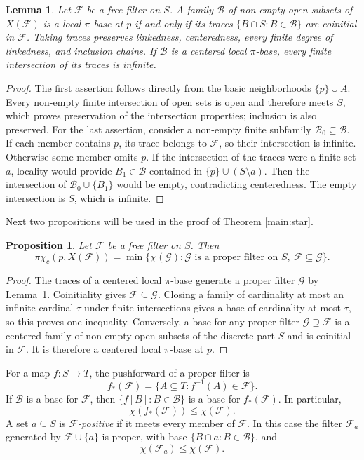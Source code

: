\documentclass[11pt,a4paper]{amsart}
\newtheorem{proposition}[theorem]{Proposition}
\newtheorem{lemma}[theorem]{Lemma}
\theoremstyle{definition}
\theoremstyle{remark}
\newcommand{\F}{\mathcal F}
\newcommand{\G}{\mathcal G}
\newcommand{\B}{\mathcal B}
\newcommand{\pcc}{\pi\chi_c}
\begin{document}
\begin{lemma}\label{lem:traces}
Let $\F$ be a free filter on $S$. A family $\B$ of non-empty open subsets of $X(\F)$ is a local $\pi$-base at $p$ if and only if its traces $\{B\cap S:B\in\B\}$ are coinitial in $\F$. Taking traces preserves linkedness, centeredness, every finite degree of linkedness, and inclusion chains. If $\B$ is a centered local $\pi$-base, every finite intersection of its traces is infinite.
\end{lemma}
\begin{proof}
The first assertion follows directly from the basic neighborhoods $\{p\}\cup A$. Every non-empty finite intersection of open sets is open and therefore meets $S$, which proves preservation of the intersection properties; inclusion is also preserved. For the last assertion, consider a non-empty finite subfamily $\B_0\subseteq\B$. If each member contains $p$, its trace belongs to $\F$, so their intersection is infinite. Otherwise some member omits $p$. If the intersection of the traces were a finite set $a$, locality would provide $B_1\in\B$ contained in $\{p\}\cup(S\setminus a)$. Then the intersection of $\B_0\cup\{B_1\}$ would be empty, contradicting centeredness. The empty intersection is $S$, which is infinite.
\end{proof}
Next two propositions will be used in the proof of Theorem \ref{main:star}.
\begin{proposition}\label{prop:extensions}
Let $\F$ be a free filter on $S$. Then
\begin{equation}\label{eq:extensions}
\pcc(p,X(\F))=
\min\{\chi(\G):\G\text{ is a proper filter on }S,\ \F\subseteq\G\}.
\end{equation}
\end{proposition}
\begin{proof}
The traces of a centered local $\pi$-base generate a proper filter $\G$ by Lemma~\ref{lem:traces}. Coinitiality gives $\F\subseteq\G$. Closing a family of cardinality at most an infinite cardinal $\tau$ under finite intersections gives a base of cardinality at most $\tau$, so this proves one inequality. Conversely, a base for any proper filter $\G\supseteq\F$ is a centered family of non-empty open subsets of the discrete part $S$ and is coinitial in $\F$. It is therefore a centered local $\pi$-base at $p$.
\end{proof}

For a map $f:S\to T$, the pushforward of a proper filter is
\[
f_*(\F)=\{A\subseteq T:f^{-1}(A)\in\F\}.
\]
If $\B$ is a base for $\F$, then $\{f[B]:B\in\B\}$ is a base for $f_*(\F)$. In particular,
\begin{equation}\label{eq:pushcharacter}
\chi(f_*(\F))\leqslant\chi(\F).
\end{equation}
A set $a\subseteq S$ is \emph{$\F$-positive} if it meets every member of $\F$. In this case the filter $\F_a$ generated by $\F\cup\{a\}$ is proper, with base $\{B\cap a:B\in\B\}$, and
\begin{equation}\label{eq:restrictcharacter}
\chi(\F_a)\leqslant\chi(\F).
\end{equation}
\end{document}
